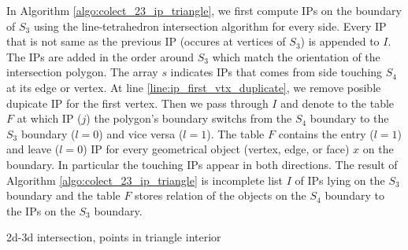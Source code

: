 \documentclass{elsarticle}
\begin{document}
In Algorithm \ref{algo:colect_23_ip_triangle}, we first compute IPs
on the boundary of $S_3$ using the line-tetrahedron intersection algorithm for every side. Every IP that is not same as the previous IP 
(occures at vertices of $S_3$) is appended to $I$. The IPs are added in the order around $S_3$ which match the orientation of the intersection polygon.
The array $s$ indicates IPs that comes from side touching $S_4$ at its edge or vertex. 
At line \ref{line:ip_first_vtx_duplicate}, we remove posible dupicate IP for the first vertex.
Then we pass through $I$ and denote to the table $F$ at which IP ($j$) the polygon's boundary switchs from the $S_4$ boundary to the $S_3$ boundary
($l=0$) and vice versa ($l=1$). The table $F$ contains the entry ($l=1$) and leave ($l=0$) IP for every geometrical object (vertex, edge, or  face) 
$x$ on the boundary. In particular the touching IPs appear in both directions. The result of Algorithm \ref{algo:colect_23_ip_triangle} is incomplete 
list $I$ of IPs lying on the $S_3$ boundary and the table $F$ stores relation of the objects on the $S_4$ boundary to the IPs on the $S_3$ boundary.


\begin{algorithm}  
  \caption{2d-3d intersection, points in triangle interior}
  \label{algo:collect_23_ip_edges}
  
  \DontPrintSemicolon
  
\end{algorithm}
\end{document}
